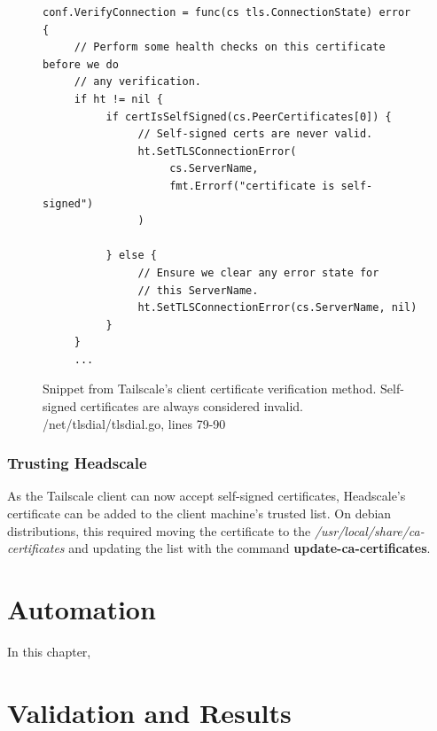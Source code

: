 \documentclass[11pt,twoside,a4paper]{report}
\begin{document}
\begin{figure}
\centering
\begin{lstlisting}
conf.VerifyConnection = func(cs tls.ConnectionState) error {
     // Perform some health checks on this certificate before we do
     // any verification.
     if ht != nil {
          if certIsSelfSigned(cs.PeerCertificates[0]) {
               // Self-signed certs are never valid.
               ht.SetTLSConnectionError(
                    cs.ServerName,
                    fmt.Errorf("certificate is self-signed")
               )

          } else {
               // Ensure we clear any error state for
               // this ServerName.
               ht.SetTLSConnectionError(cs.ServerName, nil)
          }
     }
     ...
\end{lstlisting}
\label{fig:tscert}
\caption{Snippet from Tailscale's client certificate verification method. Self-signed certificates are always considered invalid. /net/tlsdial/tlsdial.go, lines 79-90 }
\end{figure}

\subsection{Trusting Headscale}

As the Tailscale client can now accept self-signed certificates, Headscale's certificate can be added to the client machine's trusted list. On debian distributions, this required moving the certificate to the \emph{/usr/local/share/ca-certificates} and updating the list with the command \textbf{update-ca-certificates}.

\chapter{Automation}

In this chapter,

\chapter{Validation and Results}
\label{chap:results}
\end{document}
